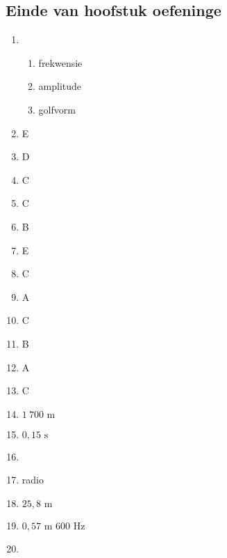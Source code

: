 \subsection{Einde van hoofstuk oefeninge} 
\begin{multicols}{5}
  \begin{enumerate}[itemsep=5pt, label=\textbf{\arabic*}. ]
  \item %
    \begin{enumerate}[noitemsep, label=\textbf{(\alph*)} ]
    \item frekwensie
    \item amplitude
\item golfvorm
    \end{enumerate}
  \item %
E
  \item %
D
  \item %
C
  \item %
C
  \item %
B
  \item %
E
  \item %
C
  \item %
A
  \item %
C
    \item %
B
    \item %
A
\item %
C
\item %
$1~700 \text{ m}$
\item %
$0,15 \text{ s}$
\item %
\item %
radio
\item %
$25,8 \text{ m}$
\item %
$0,57 \text{ m}$ $600 \text{ Hz}$
\item %

\end{enumerate}
\end{multicols}

